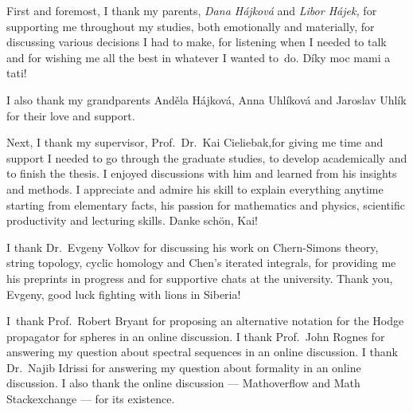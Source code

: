 \documentclass[\MainFolder/Text.tex]{subfiles}
\begin{document}

First and foremost, I thank my parents, \emph{Dana H\'ajkov\'a} and \emph{Libor H\'ajek,} for supporting me throughout my studies, both emotionally and materially, for discussing various decisions I had to make, for listening when I needed to talk and for wishing me all the best in whatever I wanted to~do.
D\'iky moc mami a tati!

I also thank my grandparents And\v{e}la H\'ajkov\'a, Anna Uhl\'ikov\'a and Jaroslav Uhl\'ik for their love and support.

Next, I thank my supervisor, Prof.~Dr.~Kai Cieliebak,for giving me time and support I needed to go through the graduate studies, to develop academically and to finish the thesis. I enjoyed discussions with him and learned from his insights and methods. I appreciate and admire his skill to explain everything anytime starting from elementary facts, his passion for mathematics and physics, scientific productivity and lecturing skills. Danke sch\"on, Kai!



I thank Dr.~Evgeny Volkov for discussing his work on Chern-Simons theory, string topology, cyclic homology and Chen's iterated integrals, for providing me his preprints in progress and for supportive chats at the university. Thank you, Evgeny, good luck fighting with lions in Siberia!

I~thank Prof.~Robert Bryant for proposing an alternative notation for the Hodge propagator for spheres in an online discussion. I thank Prof.~John Rognes for answering my question about spectral sequences in an online discussion. I thank Dr.~Najib Idrissi for answering my question about formality in an online discussion. I also thank the online discussion --- Mathoverflow and Math Stackexchange --- for its existence.
\end{document}
